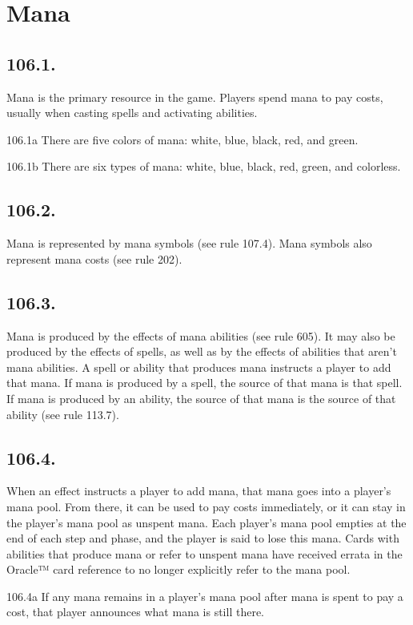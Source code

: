 \section{Mana}
\subsection*{106.1.}
Mana is the primary resource in the game. Players spend mana to pay costs, usually when casting spells and activating abilities.

106.1a There are five colors of mana: white, blue, black, red, and green.

106.1b There are six types of mana: white, blue, black, red, green, and colorless.

\subsection*{106.2.}
Mana is represented by mana symbols (see rule 107.4). Mana symbols also represent mana costs (see rule 202).

\subsection*{106.3.}
Mana is produced by the effects of mana abilities (see rule 605). It may also be produced by the effects of spells, as well as by the effects of abilities that aren’t mana abilities. A spell or ability that produces mana instructs a player to add that mana. If mana is produced by a spell, the source of that mana is that spell. If mana is produced by an ability, the source of that mana is the source of that ability (see rule 113.7).

\subsection*{106.4.}
When an effect instructs a player to add mana, that mana goes into a player’s mana pool. From there, it can be used to pay costs immediately, or it can stay in the player’s mana pool as unspent mana. Each player’s mana pool empties at the end of each step and phase, and the player is said to lose this mana. Cards with abilities that produce mana or refer to unspent mana have received errata in the Oracle™ card reference to no longer explicitly refer to the mana pool.

106.4a If any mana remains in a player’s mana pool after mana is spent to pay a cost, that player announces what mana is still there.

